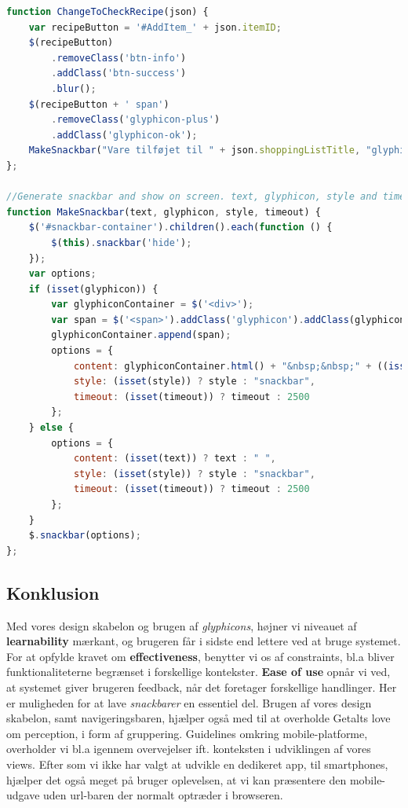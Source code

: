 \begin{lstlisting}[language=JavaScript,caption={Javascript funktioner, der giver bruger feedback},label=code:user_feedback]
function ChangeToCheckRecipe(json) {
    var recipeButton = '#AddItem_' + json.itemID;
    $(recipeButton)
        .removeClass('btn-info')
        .addClass('btn-success')
        .blur();
    $(recipeButton + ' span')
        .removeClass('glyphicon-plus')
        .addClass('glyphicon-ok');
    MakeSnackbar("Vare tilføjet til " + json.shoppingListTitle, "glyphicon-ok", "toast", "1500");
};

//Generate snackbar and show on screen. text, glyphicon, style and timeout is optional.
function MakeSnackbar(text, glyphicon, style, timeout) {
    $('#snackbar-container').children().each(function () {
        $(this).snackbar('hide');
    });
    var options;
    if (isset(glyphicon)) {
        var glyphiconContainer = $('<div>');
        var span = $('<span>').addClass('glyphicon').addClass(glyphicon);
        glyphiconContainer.append(span);
        options = {
            content: glyphiconContainer.html() + "&nbsp;&nbsp;" + ((isset(text)) ? text : " "),
            style: (isset(style)) ? style : "snackbar",
            timeout: (isset(timeout)) ? timeout : 2500
        };
    } else {
        options = {
            content: (isset(text)) ? text : " ",
            style: (isset(style)) ? style : "snackbar",
            timeout: (isset(timeout)) ? timeout : 2500
        };
    }
    $.snackbar(options);
};
\end{lstlisting}

\subsection{Konklusion}
Med vores design skabelon og brugen af \textit{glyphicons}, højner vi niveauet af \textbf{learnability} mærkant, og brugeren får i sidste end lettere ved at bruge systemet.
For at opfylde kravet om \textbf{effectiveness}, benytter vi os af constraints, bl.a bliver funktionaliteterne begrænset i forskellige kontekster.
\textbf{Ease of use} opnår vi ved, at systemet giver brugeren feedback, når det foretager forskellige handlinger.
Her er muligheden for at lave \textit{snackbarer} en essentiel del.
Brugen af vores design skabelon, samt navigeringsbaren, hjælper også med til at overholde Getalts love om perception, i form af gruppering.
Guidelines omkring mobile-platforme, overholder vi bl.a igennem overvejelser ift. konteksten i udviklingen af vores views.
Efter som vi ikke har valgt at udvikle en dedikeret app, til smartphones, hjælper det også meget på bruger oplevelsen, at vi kan præsentere den mobile-udgave uden url-baren der normalt optræder i browseren.